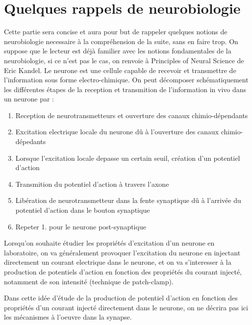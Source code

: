 \documentclass[12pt]{scrartcl}
\begin{document}
\pagebreak

\section{Quelques rappels de neurobiologie}
	Cette partie sera concise et aura pour but de rappeler quelques notions de neurobiologie necessaire à la compréhension de la suite, sans en faire trop. On suppose que le lecteur est déjà familier avec les notions fondamentales de la neurobiologie, si ce n'est pas le cas, on renvoie à Principles of Neural Science de Eric Kandel.  
Le neurone est une cellule capable de recevoir et transmettre de l'information sous forme electro-chimique. On peut décomposer schématiquement les différentes étapes de la reception et transmition de l'information in vivo dans un neurone par :
\begin{enumerate}
	\item Reception de neurotransmetteurs et ouverture des canaux chimio-dépendants
	\item Excitation electrique locale du neurone dû à l'ouverture des canaux chimio-dépedants
	\item Lorsque l'excitation locale depasse un certain seuil, création d'un potentiel d'action
	\item Transmition du potentiel d'action à travers l'axone
	\item Libération de neurotransmetteur dans la fente synaptique dû à l'arrivée du potentiel d'action dans le bouton synaptique 
	\item Repeter 1. pour le neurone post-synaptique
\end{enumerate}

	Lorsqu'on souhaite étudier les propriétés d'excitation d'un neurone en laboratoire, on va généralement provoquer l'excitation du neurone en injectant directement un courant electrique dans le neurone, et on va s'interesser à la production de potentiels d'action en fonction des propriétés du courant injecté, notamment de son intensité (technique de patch-clamp). 

	Dans cette idée d'étude de la production de potentiel d'action en fonction des propriétés d'un courant injecté directement dans le neurone, on ne décrira pas ici les mécanismes à l'oeuvre dans la synapse.
\end{document}
